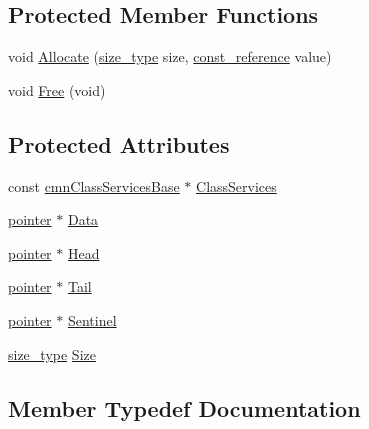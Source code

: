 \subsection*{Protected Member Functions}
\begin{DoxyCompactItemize}
\item 
void \hyperlink{classmts_queue_generic_a0b52e7ce7da384217e55aac6dbb9ccbb}{Allocate} (\hyperlink{classmts_queue_generic_a3812ba15591f4a89a9df272391739e6f}{size\+\_\+type} size, \hyperlink{classmts_queue_generic_ad133c14265ada42f3347b90ccdd28cd3}{const\+\_\+reference} value)
\item 
void \hyperlink{classmts_queue_generic_a19094b93e750a951020dc0975bbe01af}{Free} (void)
\end{DoxyCompactItemize}
\subsection*{Protected Attributes}
\begin{DoxyCompactItemize}
\item 
const \hyperlink{classcmn_class_services_base}{cmn\+Class\+Services\+Base} $\ast$ \hyperlink{classmts_queue_generic_a321c0717536a770624f08d115035bd6d}{Class\+Services}
\item 
\hyperlink{classmts_queue_generic_aa3ad46661cfdf9f182fd9c32315930a5}{pointer} $\ast$ \hyperlink{classmts_queue_generic_a0507afc9cf7884640baff2df53ed93ea}{Data}
\item 
\hyperlink{classmts_queue_generic_aa3ad46661cfdf9f182fd9c32315930a5}{pointer} $\ast$ \hyperlink{classmts_queue_generic_aab4eea6a40fa92da11b717f656a0e115}{Head}
\item 
\hyperlink{classmts_queue_generic_aa3ad46661cfdf9f182fd9c32315930a5}{pointer} $\ast$ \hyperlink{classmts_queue_generic_a892964deb939b83138b69b9b852e1f7d}{Tail}
\item 
\hyperlink{classmts_queue_generic_aa3ad46661cfdf9f182fd9c32315930a5}{pointer} $\ast$ \hyperlink{classmts_queue_generic_af8b2c1f7982cd66fa6b48481bca7b029}{Sentinel}
\item 
\hyperlink{classmts_queue_generic_a3812ba15591f4a89a9df272391739e6f}{size\+\_\+type} \hyperlink{classmts_queue_generic_a5ac0990984482842ee9dcdf7e27e04ff}{Size}
\end{DoxyCompactItemize}


\subsection{Member Typedef Documentation}
\hypertarget{classmts_queue_generic_a9b295370295fe53fee2f04a2ebd929b8}{}
